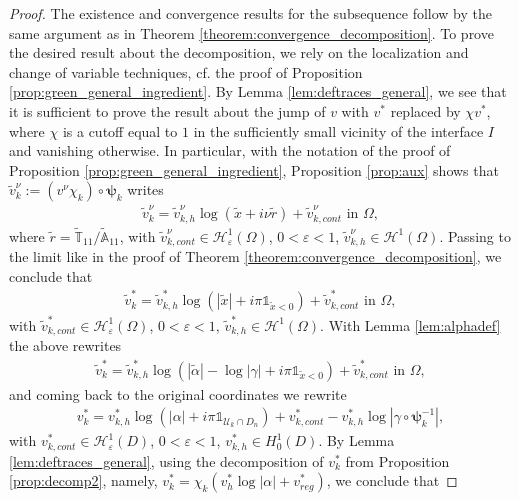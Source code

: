 \documentclass[report]{elsarticle}
\numberwithin{theorem}{section}
\newcommand{\bpsi}{\boldsymbol{\psi}}
\newcommand{\re}{\varepsilon}
\begin{document}
\begin{proof}
	The existence and convergence results for the subsequence follow by the same argument as in Theorem \ref{theorem:convergence_decomposition}. 
To prove the desired result about the decomposition, we rely on the localization and change of variable techniques, cf. the proof of Proposition \ref{prop:green_general_ingredient}. By Lemma \ref{lem:deftraces_general}, we see that it is sufficient to prove the result about the jump of $v$ with $v^*$ replaced by $\chi v^*$, where $\chi$ is a cutoff equal to $1$ in the sufficiently small vicinity of the interface $I$ and vanishing otherwise. 
In particular, with the notation of the proof of Proposition \ref{prop:green_general_ingredient}, Proposition \ref{prop:aux} shows that  $\widetilde{v}_{k}^{\nu}:=(v^{\nu}\chi_k)\circ\bpsi_k$ writes 
\begin{align*}
	\widetilde{v}_{k}^{\nu}=\widetilde{v}_{k,h}^{\nu}\log(\widetilde{x}+i\nu\widetilde{r})+\widetilde{v}_{k,cont}^{\nu} \text{ in }\Omega,
\end{align*}
where $\widetilde{r}=\widetilde{\mathbb{T}}_{11}/\widetilde{\mathbb{A}}_{11}$, with $\widetilde{v}_{k,cont}^{\nu}\in \mathcal{H}^1_{\re}(\Omega)$, $0<\re<1$,  $\widetilde{v}_{k,h}^{\nu}\in \mathcal{H}^1(\Omega)$. Passing to the limit like in the proof of Theorem \ref{theorem:convergence_decomposition}, we conclude that 
\begin{align*}
	\widetilde{v}_{k}^{*}=\widetilde{v}_{k,h}^{*}\log(|\widetilde{x}|+i\pi\mathbb{1}_{\widetilde{x}<0})+\widetilde{v}_{k,cont}^{*} \text{ in }\Omega,	
\end{align*}
 with $\widetilde{v}_{k,cont}^*\in \mathcal{H}^1_{\re}(\Omega)$, $0<\re<1$,  $\widetilde{v}_{k,h}^*\in \mathcal{H}^1(\Omega)$. With Lemma \ref{lem:alphadef} the above rewrites 
\begin{align*}
	\widetilde{v}_{k}^{*}=\widetilde{v}_{k,h}^{*}\log(|\widetilde{\alpha}|-\log|\gamma|+i\pi\mathbb{1}_{\widetilde{x}<0})+\widetilde{v}_{k,cont}^{*}\text{ in }\Omega,	
\end{align*} 
and coming back to the original coordinates we rewrite
\begin{align*}
	v_k^*=v^*_{k,h}\log(|\alpha|+i\pi \mathbb{1}_{\mathcal{U}_{k}\cap D_n})+v_{k,cont}^*-{v}^*_{k,h}\log|\gamma\circ\bpsi_k^{-1}|,
\end{align*}
with ${v}_{k,cont}^*\in \mathcal{H}^1_{\re}(D)$, $0<\re<1$,  ${v}_{k,h}^*\in {H}^1_0(D)$. By Lemma \ref{lem:deftraces_general}, using the decomposition of $v_k^*$ from Proposition \ref{prop:decomp2}, namely, $v_k^*=\chi_k(v_h^*\log|\alpha|+v_{reg}^*)$, we conclude that 

\end{proof}
\end{document}
